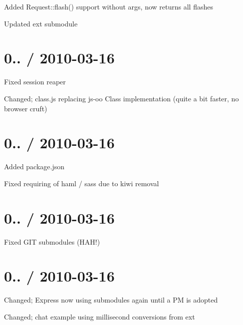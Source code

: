 \begin{DoxyItemize}
\item Added Request\+::flash() support without args, now returns all flashes
\item Updated ext submodule
\end{DoxyItemize}

\section*{0.. / 2010-\/03-\/16 }


\begin{DoxyItemize}
\item Fixed session reaper
\item Changed; class.\+js replacing js-\/oo Class implementation (quite a bit faster, no browser cruft)
\end{DoxyItemize}

\section*{0.. / 2010-\/03-\/16 }


\begin{DoxyItemize}
\item Added package.\+json
\item Fixed requiring of haml / sass due to kiwi removal
\end{DoxyItemize}

\section*{0.. / 2010-\/03-\/16 }


\begin{DoxyItemize}
\item Fixed G\+I\+T submodules (H\+A\+H!)
\end{DoxyItemize}

\section*{0.. / 2010-\/03-\/16 }


\begin{DoxyItemize}
\item Changed; Express now using submodules again until a P\+M is adopted
\item Changed; chat example using millisecond conversions from ext
\end{DoxyItemize}

